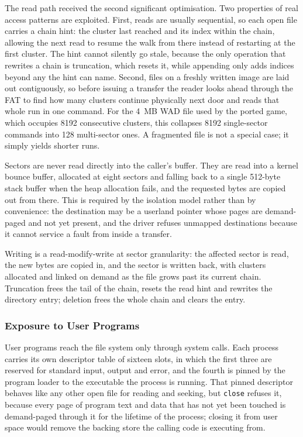 The read path received the second significant optimisation. Two properties of
real access patterns are exploited. First, reads are usually sequential, so
each open file carries a chain hint: the cluster last reached and its index
within the chain, allowing the next read to resume the walk from there instead
of restarting at the first cluster. The hint cannot silently go stale, because
the only operation that rewrites a chain is truncation, which resets it, while
appending only adds indices beyond any the hint can name. Second, files on a
freshly written image are laid out contiguously, so before issuing a transfer
the reader looks ahead through the FAT to find how many clusters continue
physically next door and reads that whole run in one command. For the 4~MB WAD
file used by the ported game, which occupies 8192 consecutive clusters, this
collapses 8192 single-sector commands into 128 multi-sector ones. A fragmented
file is not a special case; it simply yields shorter runs.

Sectors are never read directly into the caller's buffer. They are read into a
kernel bounce buffer, allocated at eight sectors and falling back to a single
512-byte stack buffer when the heap allocation fails, and the requested bytes
are copied out from there. This is required by the isolation model rather than
by convenience: the destination may be a userland pointer whose pages are
demand-paged and not yet present, and the driver refuses unmapped destinations
because it cannot service a fault from inside a transfer.

Writing is a read-modify-write at sector granularity: the affected sector is
read, the new bytes are copied in, and the sector is written back, with clusters
allocated and linked on demand as the file grows past its current chain.
Truncation frees the tail of the chain, resets the read hint and rewrites the
directory entry; deletion frees the whole chain and clears the entry.

\subsubsection{Exposure to User Programs}

User programs reach the file system only through system calls. Each process
carries its own descriptor table of sixteen slots, in which the first three are
reserved for standard input, output and error, and the fourth is pinned by the
program loader to the executable the process is running. That pinned descriptor
behaves like any other open file for reading and seeking, but \texttt{close}
refuses it, because every page of program text and data that has not yet been
touched is demand-paged through it for the lifetime of the process; closing it
from user space would remove the backing store the calling code is executing
from.

